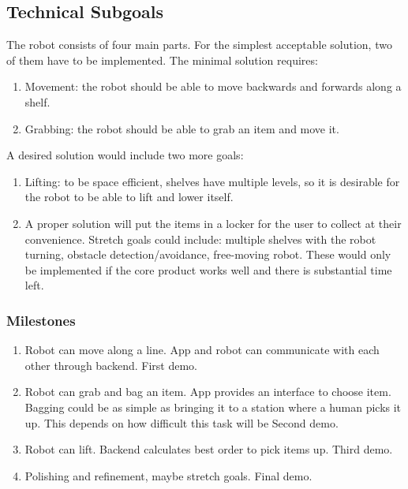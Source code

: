 \documentclass[12pt]{article}
\newcounter{subgoals}
\begin{document}
\subsection*{Technical Subgoals}
The robot consists of four main parts. For the simplest acceptable solution, two of them have to be implemented.
The minimal solution requires:

\begin{enumerate}
    \item Movement: the robot should be able to move backwards and forwards along a shelf. 
    \item Grabbing: the robot should be able to grab an item and move it.
\setcounter{subgoals}{\value{enumi}}
\end{enumerate}
A desired solution would include two more goals:
\begin{enumerate}
\setcounter{enumi}{\value{subgoals}}
    \item Lifting: to be space efficient, shelves have multiple levels, so it is desirable for the robot to be able to lift and lower itself.
    \item A proper solution will put the items in a locker for the user to collect at their convenience. 
    Stretch goals could include: multiple shelves with the robot turning, obstacle detection/avoidance, free-moving robot. These would only be implemented if the core product works well and there is substantial time left.
\end{enumerate}

\subsubsection*{Milestones}

\begin{enumerate}
    \item Robot can move along a line. App and robot can communicate with each other through backend.
    \newline
    First demo.
    \item Robot can grab and bag an item. App provides an interface to choose item. Bagging could be as simple as bringing it to a station where a human picks it up. This depends on how difficult this task will be
    \newline
    Second demo.
    \item Robot can lift. Backend calculates best order to pick items up.
    \newline
    Third demo.
    \item Polishing and refinement, maybe stretch goals.
    \newline
    Final demo.
\end{enumerate}
\end{document}
